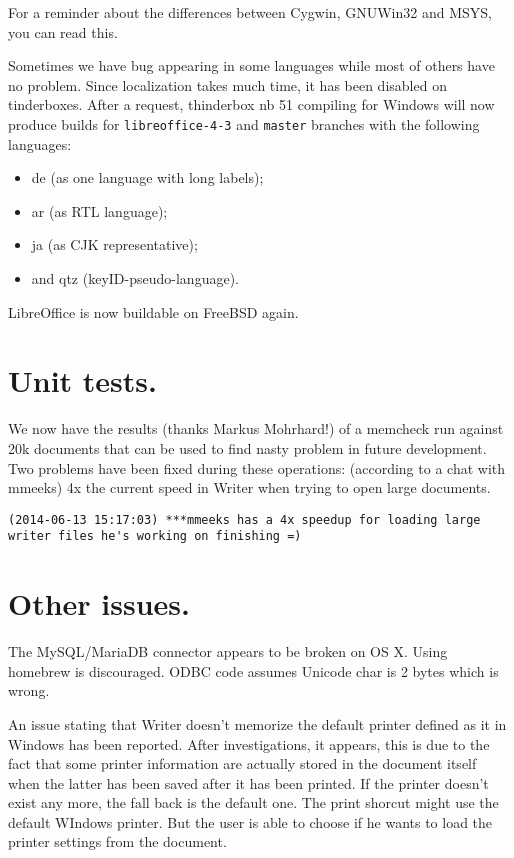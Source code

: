 \documentclass{article}
\begin{document}
For a reminder about the differences between Cygwin, GNUWin32 and MSYS, you can read this\cite{winBuildCygwinMsysGnuWin32Comparison}.

Sometimes we have bug appearing in some languages while most of others have no problem. Since localization takes much time, it has been disabled on tinderboxes. After a request, thinderbox nb 51 compiling for Windows will now produce builds for \lstinline{libreoffice-4-3} and \lstinline{master} branches with the following languages:
\begin{itemize}
    \item de (as one language with long labels);
    \item ar (as RTL language);
    \item ja (as CJK representative);
    \item and qtz (keyID-pseudo-language).
\end{itemize}

LibreOffice is now buildable on FreeBSD again\cite{freeBsdBuild1}\cite{freeBsdBuild2}.

\section{Unit tests.}

We now have the results (thanks Markus Mohrhard!) of a memcheck run against 20k documents that can
be used to find nasty problem in future development\cite{memcheckTests}. Two problems
have been fixed during these operations: (according to a chat with
mmeeks) 4x the current speed in Writer when trying to open large documents.

\begin{lstlisting}
(2014-06-13 15:17:03) ***mmeeks has a 4x speedup for loading large writer files he's working on finishing =)
\end{lstlisting}

\section{Other issues.}

The MySQL/MariaDB connector appears to be broken on OS X. Using homebrew
is discouraged. ODBC code assumes Unicode char is 2 bytes which is wrong\cite{sqlConnectorOsx1}\cite{sqlConnectorOsx2}.

An issue stating that Writer doesn't memorize the default printer
defined as it in Windows has been reported. After investigations, it
appears, this is due to the fact that some printer information are
actually stored in the document itself when the latter has been saved
after it has been printed. If the printer doesn't exist any more, the
fall back is the default one\cite{writerPrinter1}. The print shorcut might use the
default WIndows printer\cite{writerPrinter2}. But the user is able to choose if he wants
to load the printer settings from the document\cite{writerPrinter3}.
\end{document}
